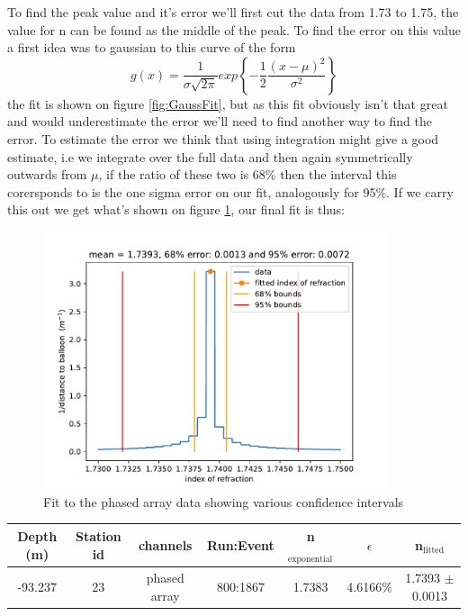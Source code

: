 \documentclass[11pt,a4paper,faculty=we,language=en,doctype=report]{cls/ugent-doc}
\begin{document}
To find the peak value and it's error we'll first cut the data from
1.73 to 1.75, the value for n can be found as the middle of the
peak. To find the error on this value a first idea was to gaussian
to this curve of the
form\cite{grabe2005measurement}
\begin{equation}
	g(x) = \frac{1}{\sigma \sqrt{2\pi}} exp\left\{-\frac{1}{2}\frac{(x-\mu)^2}{\sigma^2}\right\}
\end{equation}
the fit is shown on figure \ref{fig:GaussFit}, but as this fit
obviously isn't that great and would underestimate the error we'll
need to find another way to find the error.  To estimate the error
we think that using integration might give a good estimate, i.e we
integrate over the full data and then again symmetrically outwards
from $\mu$, if the ratio of these two is 68\% then the interval this
corersponds to is the one sigma error on our fit, analogously for
95\%. If we carry this out we get what's shown on figure
\ref{fig:PhasedArrayFit}, our final fit is thus:
\begin{figure}
	\centering
	\includegraphics[width=0.9\textwidth]{PhasedArrayFit.pdf}
	\caption{Fit to the phased array data showing various confidence intervals}
	\label{fig:PhasedArrayFit}
\end{figure}
\begin{center}
\begin{tabular}{||c c c c c c c||}
 \hline
 Depth (m) & Station id & channels & Run:Event & n$_\text{exponential}$ & $\epsilon$ & n$_\text{fitted}$\\ [0.5ex]
 \hline\hline
 -93.237 & 23 & phased array & 800:1867 & 1.7383 & 4.6166\% & 1.7393 $\pm$ 0.0013 \\
 \hline
\end{tabular}
\end{center}
\end{document}
